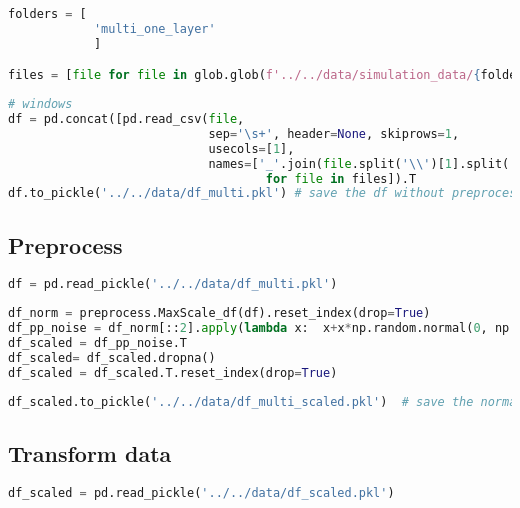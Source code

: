 \begin{lstlisting}[language=Python]
folders = [
            'multi_one_layer'
            ]

files = [file for file in glob.glob(f'../../data/simulation_data/{folders[0]}/*.spc')]
\end{lstlisting}

\begin{lstlisting}[language=Python]
# windows
df = pd.concat([pd.read_csv(file,
                            sep='\s+', header=None, skiprows=1,
                            usecols=[1],
                            names=['_'.join(file.split('\\')[1].split('_')[:-1])]).T 
                                    for file in files]).T
df.to_pickle('../../data/df_multi.pkl') # save the df without preprocessing
\end{lstlisting}

\hypertarget{preprocess-1}{%
\subsection{Preprocess}\label{preprocess-1}}

\begin{lstlisting}[language=Python]
df = pd.read_pickle('../../data/df_multi.pkl')
\end{lstlisting}

\begin{lstlisting}[language=Python]
df_norm = preprocess.MaxScale_df(df).reset_index(drop=True)                                                    # each spectrum is scaled to 1
df_pp_noise = df_norm[::2].apply(lambda x:  x+x*np.random.normal(0, np.random.randint(1,3)*0.01 , len(x)))     # reduce size to 1024 and add noise
df_scaled = df_pp_noise.T
df_scaled= df_scaled.dropna()
df_scaled = df_scaled.T.reset_index(drop=True)
\end{lstlisting}

\begin{lstlisting}[language=Python]
df_scaled.to_pickle('../../data/df_multi_scaled.pkl')  # save the normalized, scaled df
\end{lstlisting}

\hypertarget{transform-data}{%
\subsection{Transform data}\label{transform-data}}

\begin{lstlisting}[language=Python]
df_scaled = pd.read_pickle('../../data/df_scaled.pkl')
\end{lstlisting}

